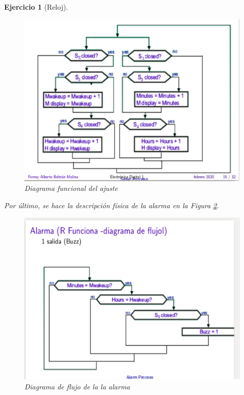 \documentclass[12pt,letterpaper]{book}
\newtheorem{exercise}{Ejercicio}
\begin{document}
\begin{exercise}[Reloj]
\begin{multicols}{2}
 
\begin{figure}[H]
\centering
\includegraphics[width=1\linewidth]{figures/repFun3.png}
\caption{Diagrama funcional del ajuste}
\label{repFun3}
\end{figure}
\vspace{0.2cm}

Por último, se hace la descripción física de la alarma en la Figura \ref{repFun4}. 

\begin{figure}[H]
\centering
\includegraphics[width=1\linewidth]{figures/repFun4.png}
\caption{Diagrama de flujo de la la alarma}
\label{repFun4}
\end{figure}
\vspace{0.2cm}


\end{multicols}
\end{exercise}
\end{document}
